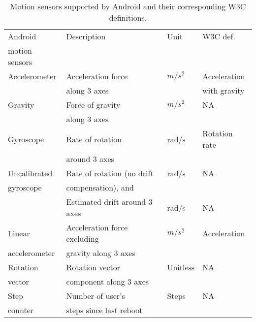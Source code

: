 \documentclass[10pt,twocolumn]{article}
\begin{document}
\begin{table*}[t]
\centering
\begin{tabular}{|l|l|l|l|}
\hline
Android & Description &  Unit & W3C def.\\
motion sensors & & &\\
\hline
Accelerometer & Acceleration force  & $m/s^2$& Acceleration \\
& along 3 axes & & with gravity\\
\hline
Gravity & Force of gravity  & $m/s^2$ & NA\\
& along 3 axes&&\\
\hline
Gyroscope & Rate of rotation  & rad/s & Rotation rate\\
&around 3 axes&&\\
\hline
Uncalibrated  & Rate of rotation (no drift & rad/s & NA\\
gyroscope&  compensation), and &&\\
& Estimated drift around 3 axes & rad/s & NA\\
\hline
Linear  & Acceleration force excluding & $m/s^2$ & Acceleration\\
accelerometer & gravity along 3 axes&&\\
\hline
Rotation  & Rotation vector   & Unitless & NA\\
vector& component along 3 axes&&\\
\hline
Step  & Number of user's  & Steps& NA\\
counter & steps since last reboot&&\\
\hline
\end{tabular}
\caption{Motion sensors supported by Android and their corresponding W3C definitions.}
\label{androidmotion}
\end{table*}
\end{document}
